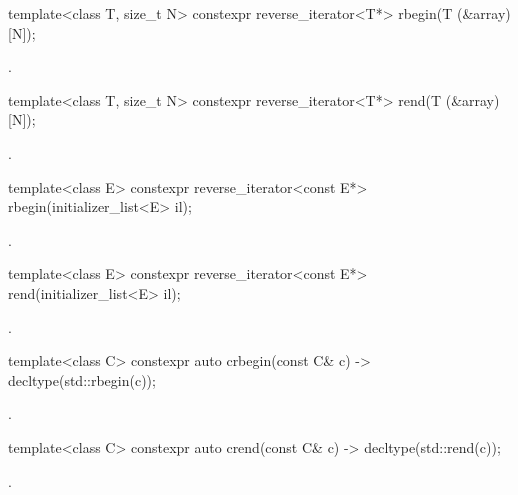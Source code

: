 %
\begin{itemdecl}
template<class T, size_t N> constexpr reverse_iterator<T*> rbegin(T (&array)[N]);
\end{itemdecl}
\begin{itemdescr}
\pnum
\returns
{}.
\end{itemdescr}

%
\begin{itemdecl}
template<class T, size_t N> constexpr reverse_iterator<T*> rend(T (&array)[N]);
\end{itemdecl}
\begin{itemdescr}
\pnum
\returns
{}.
\end{itemdescr}

%
\begin{itemdecl}
template<class E> constexpr reverse_iterator<const E*> rbegin(initializer_list<E> il);
\end{itemdecl}
\begin{itemdescr}
\pnum
\returns
{}.
\end{itemdescr}

%
\begin{itemdecl}
template<class E> constexpr reverse_iterator<const E*> rend(initializer_list<E> il);
\end{itemdecl}
\begin{itemdescr}
\pnum
\returns
{}.
\end{itemdescr}

%
\begin{itemdecl}
template<class C> constexpr auto crbegin(const C& c) -> decltype(std::rbegin(c));
\end{itemdecl}
\begin{itemdescr}
\pnum
\returns
{}.
\end{itemdescr}

%
\begin{itemdecl}
template<class C> constexpr auto crend(const C& c) -> decltype(std::rend(c));
\end{itemdecl}
\begin{itemdescr}
\pnum
\returns
{}.
\end{itemdescr}

